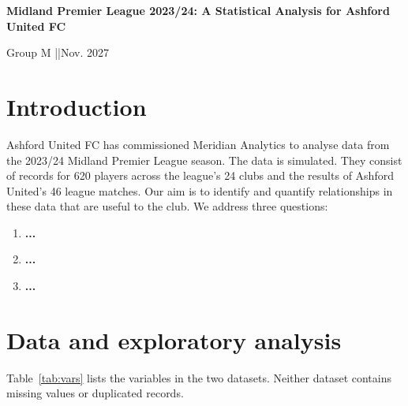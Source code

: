 \documentclass[11pt,a4paper]{article}
\begin{document}
\begin{center}
  {\Large\bfseries Midland Premier League 2023/24: A Statistical Analysis for Ashford United FC\par}
  \vspace{0.4em}
  Group M \quad| \quad|\quad Nov. 2027
\end{center}



\section{Introduction}

Ashford United FC has commissioned Meridian Analytics to analyse data from the
2023/24 Midland Premier League season. The data is simulated. They consist of
records for 620 players across the league's 24 clubs and the results of Ashford
United's 46 league matches. Our aim is to identify and quantify relationships in
these data that are useful to the club. We address three questions:
\begin{enumerate}[label=\textbf{Q\arabic*.}, leftmargin=2.6em]
  \item \textbf{...}

  \item \textbf{...} 
  
  \item \textbf{...}
  
\end{enumerate}



\section{Data and exploratory analysis}\label{sec:data}

Table~\ref{tab:vars} lists the variables in the two datasets. Neither dataset
contains missing values or duplicated records.
\end{document}
